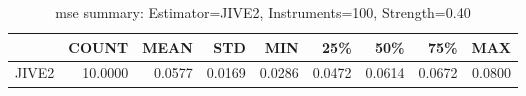 \begin{table}[ht]
\centering
\caption{mse summary: Estimator=JIVE2, Instruments=100, Strength=0.40}
\begin{tabular}{lrrrrrrrr}
\toprule
 & COUNT & MEAN & STD & MIN & 25\% & 50\% & 75\% & MAX \\
\midrule
JIVE2 & 10.0000 & 0.0577 & 0.0169 & 0.0286 & 0.0472 & 0.0614 & 0.0672 & 0.0800 \\
\bottomrule
\end{tabular}
\end{table}
